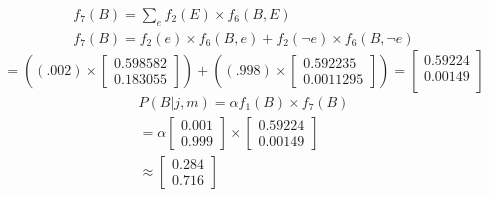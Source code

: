 \documentclass{article}
\begin{document}
\begin{enumerate}[a)]
\begin{gather*}
        f_7(B) = \sum_{e}f_2(E) \times f_6(B, E)\\
        f_7(B) = f_2(e) \times f_6(B, e) + f_2(\neg e) \times f_6(B, \neg e)
    \end{gather*}
    \begin{equation*}
        = ((.002) \times
        \begin{bmatrix}
            0.598582 \\
            0.183055
        \end{bmatrix})
        + ((.998) \times
        \begin{bmatrix}
            0.592235 \\
            0.0011295
        \end{bmatrix})
        = 
        \begin{bmatrix}
            0.59224 \\
            0.00149 \\
        \end{bmatrix}
    \end{equation*}
    \begin{gather*}
        P(B|j,m) = \alpha f_1(B) \times f_7(B) \\
        = \alpha
        \begin{bmatrix}
            0.001 \\
            0.999
        \end{bmatrix}
        \times
        \begin{bmatrix}
            0.59224 \\
            0.00149
        \end{bmatrix}\\
        \approx
        \begin{bmatrix}
            0.284 \\
            0.716
        \end{bmatrix}
    \end{gather*}
    

\end{enumerate}
\end{document}
